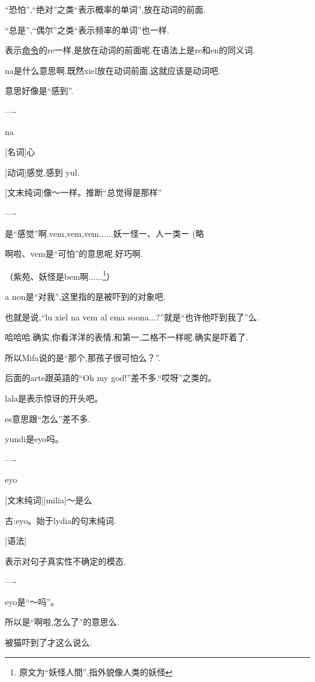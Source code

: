 ``恐怕'',``绝对''之类``表示概率的单词'',放在动词的前面.

``总是'',``偶尔''之类``表示频率的单词''也一样.


表示\hyperlink{chapter-imperative}{命令}的re一样,是放在动词的前面呢.在语法上是re和en的同义词.

na是什么意思啊.既然xiel放在动词前面,这就应该是动词吧.

意思好像是``感到''.

----

na     

[名词]心  

[动词]感觉,感到 yul.   

[文末纯词]像～一样。推断``总觉得是那样''  


----

是``感觉''啊.vem,vem,vem......妖ー怪ー、人ー类ー (略

啊啦、vem是``可怕''的意思呢.好巧啊.



（紫苑、妖怪是bem啊......\footnote{原文为``妖怪人間'',指外貌像人类的妖怪}）


a non是``对我'',这里指的是被吓到的对象吧.

也就是说,``lu xiel na vem al ema soona...?''就是``也许他吓到我了''么.

哈哈哈.确实,你看洋洋的表情,和第一,二格不一样呢.确实是吓着了.

所以Mifa说的是``那个,那孩子很可怕么？''.



后面的arte跟英語的``Oh my god!''差不多.``哎呀''之类的。

lala是表示惊讶的开头吧。


es意思跟``怎么''差不多.

yundi是eyo吗。

----

eyo

[文末纯词][milia]～是么

古:eyo。始于lydia的句末纯词.

[语法]

表示对句子真实性不确定的模态.

----


eyo是``～吗''。

所以是``啊啦,怎么了''的意思么. 

被猫吓到了才这么说么.

